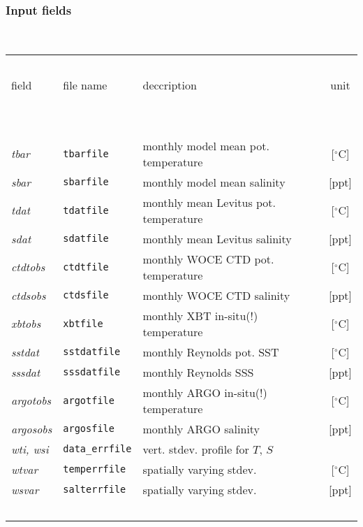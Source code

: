 \subsubsection{Input fields}
~

\begin{table}[!ht]
\begin{center}
\begin{tabular}{lllc}
\hline \hline
~&~&~&~\\
field & file name & deccription & unit \\
~&~&~&~\\
\hline
~&~&~&~\\
{\it tbar} & {\tt tbarfile} & monthly model mean pot. temperature & 
[$^{\circ}\mathrm{C}$] \\
{\it sbar} & {\tt sbarfile} & monthly model mean salinity & 
[ppt] \\
{\it tdat} & {\tt tdatfile} & monthly mean Levitus pot. temperature & 
[$^{\circ}\mathrm{C}$] \\
{\it sdat} & {\tt sdatfile} & monthly mean Levitus salinity & 
[ppt] \\
{\it ctdtobs}  & {\tt ctdtfile} & monthly WOCE CTD pot. temperature & 
[$^{\circ}\mathrm{C}$] \\
{\it ctdsobs}  & {\tt ctdsfile} & monthly WOCE CTD salinity & 
[ppt] \\
{\it xbtobs} & {\tt xbtfile} & monthly XBT in-situ(!) temperature & 
[$^{\circ}\mathrm{C}$] \\
{\it sstdat}  & {\tt sstdatfile} & monthly Reynolds pot. SST & 
[$^{\circ}\mathrm{C}$] \\
{\it sssdat}  & {\tt sssdatfile} & monthly Reynolds SSS & 
[ppt] \\
{\it argotobs}  & {\tt argotfile} & monthly ARGO in-situ(!) temperature & 
[$^{\circ}\mathrm{C}$] \\
{\it argosobs}  & {\tt argosfile} & monthly ARGO salinity & 
[ppt] \\
{\it wti, wsi} & {\tt data\_errfile} & vert. stdev. profile for $T$, $S$ &
~ \\
{\it wtvar} & {\tt temperrfile} & spatially varying stdev. & [$^{\circ}\mathrm{C}$] \\
{\it wsvar} & {\tt salterrfile} & spatially varying stdev. & [ppt] \\
~&~&~&~\\
\hline \hline
\end{tabular}
\end{center}
\end{table}

